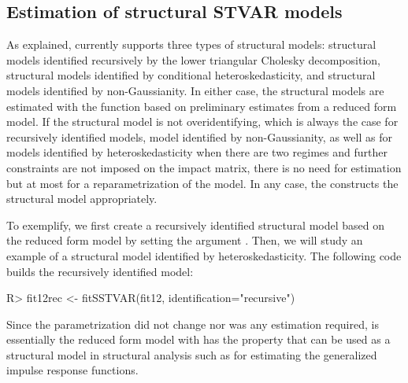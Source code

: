\documentclass[nojss]{jss}
\begin{document}
\subsection{Estimation of structural STVAR models}\label{sec:estim_structural}

As explained,  currently supports three types of structural models: structural models identified recursively by the lower triangular Cholesky decomposition, structural models identified by conditional heteroskedasticity, and structural models identified by non-Gaussianity. In either case, the structural models are estimated with the function  based on preliminary estimates from a reduced form model. If the structural model is not overidentifying, which is always the case for recursively identified models, model identified by non-Gaussianity, as well as for models identified by heteroskedasticity when there are two regimes and further constraints are not imposed on the impact matrix, there is no need for estimation but at most for a reparametrization of the model. In any case, the  constructs the structural model appropriately.

To exemplify, we first create a recursively identified structural model based on the reduced form model  by setting the argument . Then, we will study an example of a structural model identified by heteroskedasticity. The following code builds the recursively identified model:
\begin{CodeChunk}
\begin{CodeInput}
R> fit12rec <- fitSSTVAR(fit12, identification="recursive")
\end{CodeInput}
\end{CodeChunk}
Since the parametrization did not change nor was any estimation required,  is essentially the reduced form model  with has the property that can be used as a structural model in structural analysis such as for estimating the generalized impulse response functions.
\end{document}
